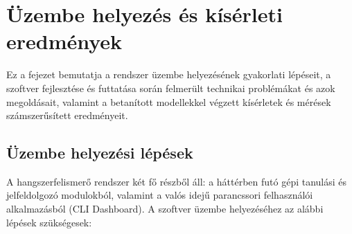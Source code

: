 \chapter{Üzembe helyezés és kísérleti eredmények}
\label{chap:uzembehelyezes}

Ez a fejezet bemutatja a rendszer üzembe helyezésének gyakorlati lépéseit, a szoftver fejlesztése és futtatása során felmerült technikai problémákat és azok megoldásait, valamint a betanított modellekkel végzett kísérletek és mérések számszerűsített eredményeit.

\section{Üzembe helyezési lépések}
\label{sec:uzembehelyezes}

A hangszerfelismerő rendszer két fő részből áll: a háttérben futó gépi tanulási és jelfeldolgozó modulokból, valamint a valós idejű parancssori felhasználói alkalmazásból (CLI Dashboard). A szoftver üzembe helyezéséhez az alábbi lépések szükségesek:


